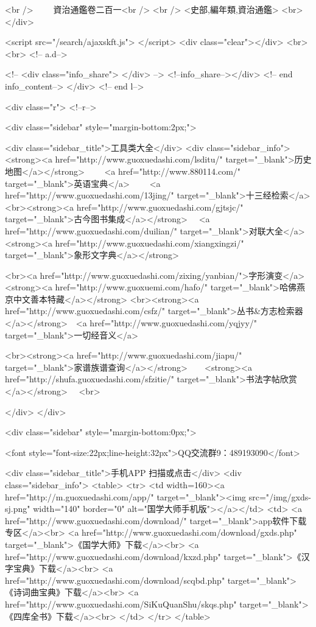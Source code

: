 <br />
　　資治通鑑卷二百一<br />
<br />
<史部,編年類,資治通鑑>  <br>
   </div> 

<script src="/search/ajaxskft.js"> </script>
 <div class="clear"></div>
<br>
<br>
 <!-- a.d-->

 <!--
<div class="info_share">
</div> 
-->
 <!--info_share--></div>   <!-- end info_content-->
  </div> <!-- end l-->

<div class="r">   <!--r-->



<div class="sidebar"  style="margin-bottom:2px;">

 
<div class="sidebar_title">工具类大全</div>
<div class="sidebar_info">
<strong><a href="http://www.guoxuedashi.com/lsditu/" target="_blank">历史地图</a></strong>　　
<a href="http://www.880114.com/" target="_blank">英语宝典</a>　　
<a href="http://www.guoxuedashi.com/13jing/" target="_blank">十三经检索</a>　
<br><strong><a href="http://www.guoxuedashi.com/gjtsjc/" target="_blank">古今图书集成</a></strong>　
<a href="http://www.guoxuedashi.com/duilian/" target="_blank">对联大全</a>　<strong><a href="http://www.guoxuedashi.com/xiangxingzi/" target="_blank">象形文字典</a></strong>　

<br><a href="http://www.guoxuedashi.com/zixing/yanbian/">字形演变</a>　　<strong><a href="http://www.guoxuemi.com/hafo/" target="_blank">哈佛燕京中文善本特藏</a></strong>
<br><strong><a href="http://www.guoxuedashi.com/csfz/" target="_blank">丛书&方志检索器</a></strong>　<a href="http://www.guoxuedashi.com/yqjyy/" target="_blank">一切经音义</a>　　

<br><strong><a href="http://www.guoxuedashi.com/jiapu/" target="_blank">家谱族谱查询</a></strong>　　<strong><a href="http://shufa.guoxuedashi.com/sfzitie/" target="_blank">书法字帖欣赏</a></strong>　
<br>

</div>
</div>


<div class="sidebar" style="margin-bottom:0px;">

<font style="font-size:22px;line-height:32px">QQ交流群9：489193090</font>


<div class="sidebar_title">手机APP 扫描或点击</div>
<div class="sidebar_info">
<table>
<tr>
	<td width=160><a href="http://m.guoxuedashi.com/app/" target="_blank"><img src="/img/gxds-sj.png" width="140"  border="0" alt="国学大师手机版"></a></td>
	<td>
<a href="http://www.guoxuedashi.com/download/" target="_blank">app软件下载专区</a><br>
<a href="http://www.guoxuedashi.com/download/gxds.php" target="_blank">《国学大师》下载</a><br>
<a href="http://www.guoxuedashi.com/download/kxzd.php" target="_blank">《汉字宝典》下载</a><br>
<a href="http://www.guoxuedashi.com/download/scqbd.php" target="_blank">《诗词曲宝典》下载</a><br>
<a href="http://www.guoxuedashi.com/SiKuQuanShu/skqs.php" target="_blank">《四库全书》下载</a><br>
</td>
</tr>
</table>

